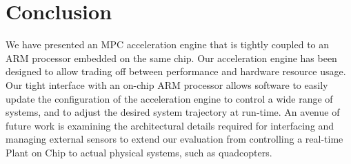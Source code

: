 \section{Conclusion}\label{con}
We have presented an MPC acceleration engine that is tightly coupled to an ARM processor embedded on the same chip. Our acceleration engine has been designed to allow trading off between performance and hardware resource usage. Our tight interface with an on-chip ARM processor allows software to easily update the configuration of the acceleration engine to control a wide range of systems, and to adjust the desired system trajectory at run-time. An avenue of future work is examining the architectural details required for interfacing and managing external sensors to extend our evaluation from controlling a real-time Plant on Chip to actual physical systems, such as quadcopters.